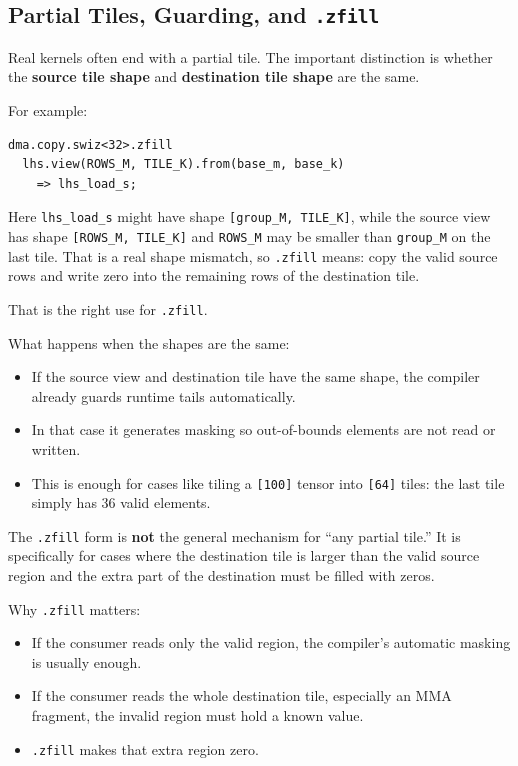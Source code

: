 \subsection*{Partial Tiles, Guarding, and \texttt{.zfill}}

Real kernels often end with a partial tile. The important distinction is whether the \textbf{source tile shape} and \textbf{destination tile shape} are the same.

For example:

\begin{lstlisting}[language=croqtile,caption={Partial Tiles, Guarding, and .zfill}]
dma.copy.swiz<32>.zfill
  lhs.view(ROWS_M, TILE_K).from(base_m, base_k)
    => lhs_load_s;
\end{lstlisting}

Here \texttt{lhs\_load\_s} might have shape \texttt{[group\_\allowbreak{}M, TILE\_\allowbreak{}K]}, while the source view has shape \texttt{[ROWS\_\allowbreak{}M, TILE\_\allowbreak{}K]} and \texttt{ROWS\_M} may be smaller than \texttt{group\_M} on the last tile. That is a real shape mismatch, so \texttt{.zfill} means: copy the valid source rows and write zero into the remaining rows of the destination tile.

That is the right use for \texttt{.zfill}.

What happens when the shapes are the same:

\begin{itemize}[leftmargin=1.6em]
\item If the source view and destination tile have the same shape, the compiler already guards runtime tails automatically.
\item In that case it generates masking so out-of-bounds elements are not read or written.
\item This is enough for cases like tiling a \texttt{[100]} tensor into \texttt{[64]} tiles: the last tile simply has 36 valid elements.
\end{itemize}

The \texttt{.zfill} form is \textbf{not} the general mechanism for ``any partial tile.'' It is specifically for cases where the destination tile is larger than the valid source region and the extra part of the destination must be filled with zeros.

Why \texttt{.zfill} matters:

\begin{itemize}[leftmargin=1.6em]
\item If the consumer reads only the valid region, the compiler's automatic masking is usually enough.
\item If the consumer reads the whole destination tile, especially an MMA fragment, the invalid region must hold a known value.
\item \texttt{.zfill} makes that extra region zero.
\end{itemize}


